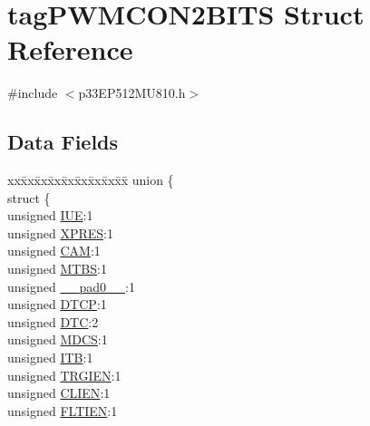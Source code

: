 \hypertarget{structtag_p_w_m_c_o_n2_b_i_t_s}{}\section{tag\+P\+W\+M\+C\+O\+N2\+B\+I\+TS Struct Reference}
\label{structtag_p_w_m_c_o_n2_b_i_t_s}


{\ttfamily \#include $<$p33\+E\+P512\+M\+U810.\+h$>$}

\subsection*{Data Fields}
\begin{DoxyCompactItemize}
\item 
\begin{tabbing}
xx\=xx\=xx\=xx\=xx\=xx\=xx\=xx\=xx\=\kill
union \{\\
\>struct \{\\
\>\>unsigned \hyperlink{structtag_p_w_m_c_o_n2_b_i_t_s_a2b95b61e8c208d0ffdc7441133d3b0a3}{IUE}:1\\
\>\>unsigned \hyperlink{structtag_p_w_m_c_o_n2_b_i_t_s_a6a3f824223966417e0005dbe08b1833c}{XPRES}:1\\
\>\>unsigned \hyperlink{structtag_p_w_m_c_o_n2_b_i_t_s_a912fd2c19cfc2bb7d43e4cb3bae4d0bf}{CAM}:1\\
\>\>unsigned \hyperlink{structtag_p_w_m_c_o_n2_b_i_t_s_ad4b1db357995f4e3ff43d2e6c734159e}{MTBS}:1\\
\>\>unsigned \hyperlink{structtag_p_w_m_c_o_n2_b_i_t_s_adf71f3d8410c1f1dbbc96680a92c49af}{\_\_pad0\_\_}:1\\
\>\>unsigned \hyperlink{structtag_p_w_m_c_o_n2_b_i_t_s_a42fd7808d2a3b328aac343a2c4e781d7}{DTCP}:1\\
\>\>unsigned \hyperlink{structtag_p_w_m_c_o_n2_b_i_t_s_a0ac766a24b648c50040810c3f207926c}{DTC}:2\\
\>\>unsigned \hyperlink{structtag_p_w_m_c_o_n2_b_i_t_s_acb5516c8c2c937478d0e653afdb05254}{MDCS}:1\\
\>\>unsigned \hyperlink{structtag_p_w_m_c_o_n2_b_i_t_s_a5d923b710199bb786b4c9f1d71b104f2}{ITB}:1\\
\>\>unsigned \hyperlink{structtag_p_w_m_c_o_n2_b_i_t_s_a4dd5600256667e48b1fe49e80ef95d33}{TRGIEN}:1\\
\>\>unsigned \hyperlink{structtag_p_w_m_c_o_n2_b_i_t_s_a6536fa9a3ad62ffb7a3ed0a2b1bf6394}{CLIEN}:1\\
\>\>unsigned \hyperlink{structtag_p_w_m_c_o_n2_b_i_t_s_a4d88b1c37d3feefa1055445ffc9a981c}{FLTIEN}:1\\

\end{tabbing}
\end{DoxyCompactItemize}
